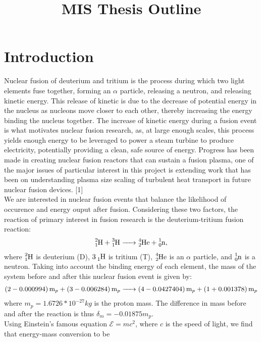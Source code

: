 \documentclass{article}
\title{ MIS Thesis Outline}
\begin{document}
\maketitle
\noindent

\section{Introduction}
Nuclear fusion of deuterium and tritium is the process during which two light elements fuse together, forming an $\alpha$ particle, releasing a neutron, and releasing kinetic energy. This release of kinetic is due to the decrease of potential energy in the nucleus as nucleons move closer to each other, thereby increasing the energy binding the nucleus together. The increase of kinetic energy during a fusion event is what motivates nuclear fusion research, as, at large enough scales, this process yields enough energy to be leveraged to power a steam turbine to produce electricity, potentially providing a clean, safe source of energy. Progress has been made in creating nuclear fusion reactors that can sustain a fusion plasma, one of the major issues of particular interest in this project is extending work that has been on understanding plasma size scaling of turbulent heat transport in future nuclear fusion devices. [1]\\
\newpage
We are interested in nuclear fusion events that balance the likelihood of occurence and energy ouput after fusion. Considering these two factors, the reaction of primary interest in fusion research is the deuterium-tritium fusion reaction:  
\begin{align*}
\ce{^2_1H + ^3_1H ->	^4_2He + ^1_0n}, 
\end{align*}	
where $\ce{^2_1H}$ is deuterium (D), $\ce{3_1H}$ is tritium (T),  $\ce{^4_2He}$ is an $\alpha$ particle, and $\ce{^1_0n}$ is a neutron.
Taking into account the binding energy of each element, the mass of the system before and after this nuclear fusion event is given by:
\begin{align*}
\ce{(2 - 0.000994)m_p +(3 - 0.006284) m_p -> (4 - 0.0427404)m_p + (1 + 0.001378)m_p}
\end{align*}
where $m_p=1.6726*10^{-27}kg$ is the proton mass. The difference in mass before and after the reaction is thus $\delta_m = -0.01875m_p$.\\
Using Einstein's famous equation $\mathcal{E} = mc^2$, where $c$ is the speed of light, we find that energy-mass conversion to be
\end{document}
